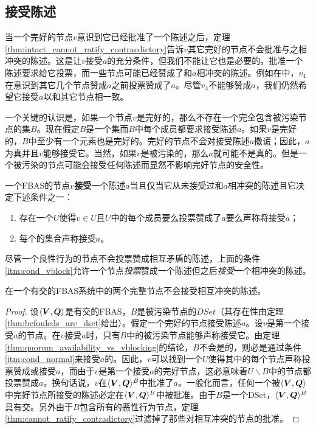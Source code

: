 \subsection{接受陈述}

当一个完好的节点$v$意识到它已经批准了一个陈述之后，定理\ref{thm:intact_cannot_ratify_contracdictory}告诉$v$其它完好的节点不会批准与之相冲突的陈述。这是让$v$接受$a$的充分条件，但我们不能让它也是必要的。批准一个陈述要求给它投票，而一些节点可能已经赞成了和$a$相冲突的陈述。例如在中，$v_4$在意识到其它几个节点赞成$a$之前投票赞成了$\bar a$。尽管$v_4$不能够赞成$a$，我们仍然希望它接受$a$以和其它节点相一致。

一个关键的认识是，如果一个节点$v$是完好的，那么不存在一个完全包含被污染节点的{\vblock}集$B$。现在假定$B$是一个{\vblock}集而$B$中每个成员都要求接受陈述$a$。如果$v$是完好的，$B$中至少有一个元素也是完好的。完好的节点不会对接受陈述$a$撒谎；因此，$a$为真并且$v$能够接受它。当然，如果$v$是被污染的，那么$a$就可能不是真的。但是一个被污染的节点可能会接受任何陈述而显然不影响完好节点的安全性。

\begin{definition}[接受]
        一个FBAS的节点$v$\textbf{接受}一个陈述$a$当且仅当它从未接受过和$a$相冲突的陈述且它决定下述条件之一：
        \begin{enumerate}
                \item\label{itm:cond_normal} 存在一个{\quorum}$U$使得$v\in U$且$U$中的每个成员要么投票赞成了$a$要么声称将接受$a$；
                \item\label{itm:cond_vblock} 每个{\vblock}的集合声称接受$a$。 
        \end{enumerate}
\end{definition}

尽管一个良性行为的节点不会投票赞成相互矛盾的陈述，上面的条件\ref{itm:cond_vblock}允许一个节点\textit{投票}赞成一个陈述但之后\textit{接受}一个相冲突的陈述。

\begin{theorem}\label{thm:intact_cannot_accept_contradictory}
        在一个有{\quorum}交的FBAS系统中的两个完整节点不会接受相互冲突的陈述。
\end{theorem}

\begin{proof}
        设$\langle{\bm V},{\bm Q}\rangle$是有{\quorum}交的FBAS，$B$是被污染节点的$DSet$（其存在性由定理\ref{thm:befouleds_are_dset}给出）。假定一个完好的节点接受陈述$a$。设$v$是第一个接受$a$的节点。在$v$接受$a$时，只有$B$中的被污染节点能够声称接受它。由定理\ref{thm:quorum_availability_vs_vblocking}的结论，$B$不会是{\vblock}的，则必是通过条件\ref{itm:cond_normal}来接受$a$的。因此，$v$可以找到一个{\quorum}$U$使得其中的每个节点声称投票赞成或接受$a$，而由于$v$是第一个接受$a$的完好节点，这必意味着$U\backslash B$中的节点都投票赞成$a$。换句话说，$v$在$\langle{\bm V},{\bm Q}\rangle^{B}$中批准了$a$。一般化而言，任何一个被$\langle{\bm V},{\bm Q}\rangle$中完好节点所接受的陈述必定在$\langle{\bm V},{\bm Q}\rangle^{B}$中被批准。由于$B$是一个DSet，$\langle{\bm V},{\bm Q}\rangle^{B}$具有{\quorum}交。另外由于$B$包含所有的恶性行为节点，定理\ref{thm:cannot_ratify_contradictory}过滤掉了那些对相互冲突的节点的批准。
\end{proof}